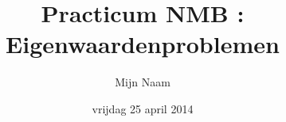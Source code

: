 \documentclass[]{article}
\title{Practicum NMB : Eigenwaardenproblemen}
\author{Mijn Naam}
\date{vrijdag 25 april 2014}
\begin{document}
\maketitle

\begin{abstract}

\end{abstract}

\section{}
\end{document}

